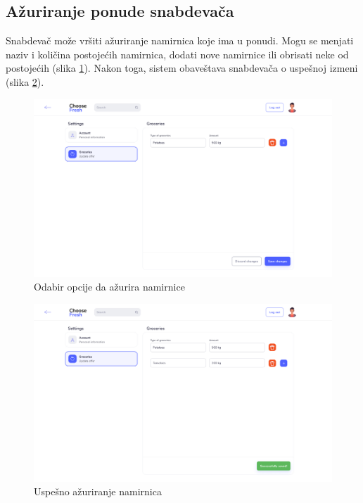 \subsection{Ažuriranje ponude snabdevača}

Snabdevač može vršiti ažuriranje namirnica koje ima u ponudi. Mogu se menjati naziv i količina postojećih namirnica, dodati nove namirnice ili obrisati neke od postojećih (slika \ref{fig:SupplierGroceriesUpdateScreen1}). Nakon toga, sistem obaveštava snabdevača o uspešnoj izmeni (slika \ref{fig:SupplierGroceriesUpdateScreen2}).

\begin{figure}[H]
	\begin{center}
		\includegraphics[width=\textwidth]{UI/Supplier Groceries Update (Screen 1).png}
    		\caption{Odabir opcije da ažurira namirnice}
    \label{fig:SupplierGroceriesUpdateScreen1}
    \end{center}
\end{figure}

\begin{figure}[H]
	\begin{center}
		\includegraphics[width=\textwidth]{UI/Supplier Groceries Update (Screen 2).png}
    		\caption{Uspešno ažuriranje namirnica}
    \label{fig:SupplierGroceriesUpdateScreen2}
    \end{center}
\end{figure}
